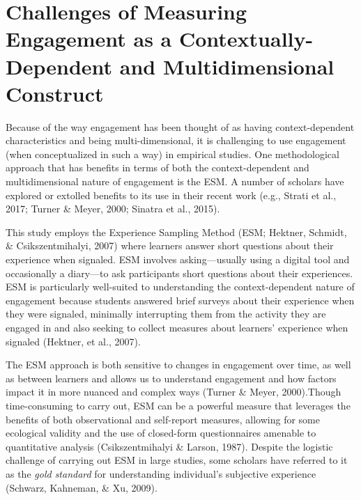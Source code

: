 \documentclass[]{book}
\theoremstyle{definition}
\theoremstyle{definition}
\theoremstyle{definition}
\theoremstyle{remark}
\begin{document}
\section{Challenges of Measuring Engagement as a Contextually-Dependent
and Multidimensional
Construct}\label{challenges-of-measuring-engagement-as-a-contextually-dependent-and-multidimensional-construct}

Because of the way engagement has been thought of as having
context-dependent characteristics and being multi-dimensional, it is
challenging to use engagement (when conceptualized in such a way) in
empirical studies. One methodological approach that has benefits in
terms of both the context-dependent and multidimensional nature of
engagement is the ESM. A number of scholars have explored or extolled
benefits to its use in their recent work (e.g., Strati et al., 2017;
Turner \& Meyer, 2000; Sinatra et al., 2015).

This study employs the Experience Sampling Method (ESM; Hektner,
Schmidt, \& Csikszentmihalyi, 2007) where learners answer short
questions about their experience when signaled. ESM involves
asking---usually using a digital tool and occasionally a diary---to ask
participants short questions about their experiences. ESM is
particularly well-suited to understanding the context-dependent nature
of engagement because students answered brief surveys about their
experience when they were signaled, minimally interrupting them from the
activity they are engaged in and also seeking to collect measures about
learners' experience when signaled (Hektner, et al., 2007).

The ESM approach is both sensitive to changes in engagement over time,
as well as between learners and allows us to understand engagement and
how factors impact it in more nuanced and complex ways (Turner \& Meyer,
2000).Though time-consuming to carry out, ESM can be a powerful measure
that leverages the benefits of both observational and self-report
measures, allowing for some ecological validity and the use of
closed-form questionnaires amenable to quantitative analysis
(Csikszentmihalyi \& Larson, 1987). Despite the logistic challenge of
carrying out ESM in large studies, some scholars have referred to it as
the \emph{gold standard} for understanding individual's subjective
experience (Schwarz, Kahneman, \& Xu, 2009).
\end{document}
